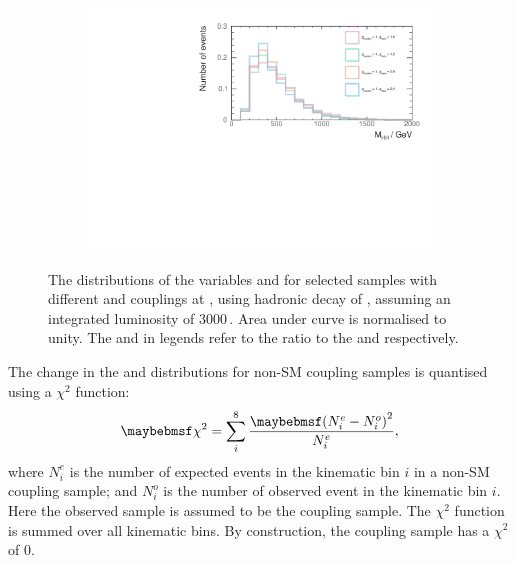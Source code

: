 \begin{figure}[!htbp]
\begin{subfigure}[b]{0.45\textwidth}
    \includegraphics[width=\textwidth]{doubleHiggs/extraction/var/tR0_7_6jet_btag2_Higgs_all_M_TMVA201611283TeVtR0_7_btag2_gWWHH1}
    \caption{}
    \label{fig:doubleHiggsCouplingMHHgWWHH1}
  \end{subfigure}
\caption[$\chi^2$ as a function of $\gHHH/\gHHHSM$ and  $\gWWHH/\gWWHHSM$  at ]%
   {The distributions of the variables \HT and \mhh for selected samples with different \gHHH and \gWWHH couplings at , using hadronic \WW decay of \eeToHHbbWW, assuming an integrated luminosity of  3000\,. Area under curve is normalised to unity. The \gHHH and \gWWHH in legends refer to the ratio to the \gHHHSM and \gWWHHSM respectively.}
   \label{fig:doubleHiggsCouplingHTandMHH}
\end{figure}



The change in the \mhh and \HT distributions for  non-SM coupling samples is quantised using a $\chi^2$ function:
\begin{equation}
\chi^2 = \sum_{i}^{8}\frac{\parenths{N_i^e - N_{i}^{o}}^2}{N_{i}^e},
\label{eqn:doubleHiggsChi2}
\end{equation}
where $N_i^e$ is the number of expected  events in the kinematic bin $i$ in a non-SM coupling sample; and $ N_{i}^{o}$ is the number of observed  event in the kinematic bin $i$. Here the observed sample is assumed to be the \SM coupling sample. The  $\chi^2$ function is summed over all kinematic bins. By construction, the \SM coupling sample has a $\chi^2$ of 0.

